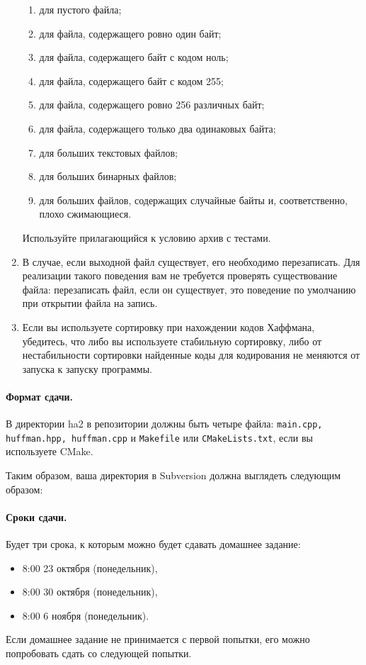 \documentclass[a4paper,10pt]{article}
\begin{document}
\begin{enumerate}
\begin{enumerate}
            \item для пустого файла;
            \item для файла, содержащего ровно один байт;
            \item для файла, содержащего байт с кодом ноль;
            \item для файла, содержащего байт с кодом 255;
            \item для файла, содержащего ровно 256 различных байт;
            \item для файла, содержащего только два одинаковых байта;
            \item для больших текстовых файлов;
            \item для больших бинарных файлов;
            \item для больших файлов, содержащих случайные байты и, соответственно, плохо сжимающиеся.
        \end{enumerate}
        Используйте прилагающийся к условию архив с тестами.
    \item В случае, если выходной файл существует, его необходимо перезаписать.
        Для реализации такого поведения вам не требуется проверять существование файла:
        перезаписать файл, если он существует, это поведение по умолчанию при открытии файла на запись.
    \item Если вы используете сортировку при нахождении кодов Хаффмана, убедитесь,
        что либо вы используете стабильную сортировку,
        либо от нестабильности сортировки найденные коды для кодирования
        не меняются от запуска к запуску программы.
\end{enumerate}

\paragraph{Формат сдачи.}
В директории ha2 в репозитории должны быть четыре файла:
{\tt main.cpp, huffman.hpp, huffman.cpp} и {\tt Makefile}
или {\tt CMakeLists.txt}, если вы используете CMake.

Таким образом, ваша директория в Subversion должна выглядеть следующим образом:

\paragraph{Сроки сдачи.}
Будет три срока, к которым можно будет сдавать домашнее задание:
\begin{itemize}
    \item 8:00 23 октября (понедельник),
    \item 8:00 30 октября (понедельник),
    \item 8:00 6 ноября (понедельник).
\end{itemize}
Если домашнее задание не принимается с первой попытки, его
можно попробовать сдать со следующей попытки.
\end{document}
